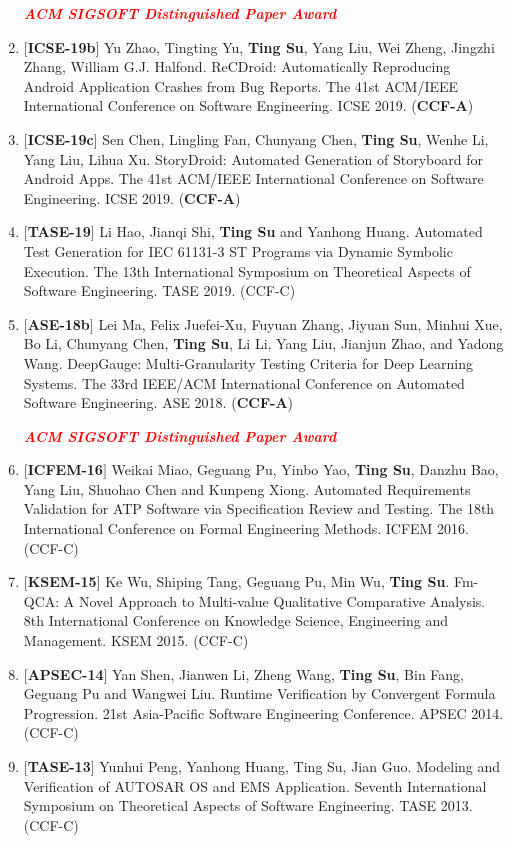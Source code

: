 \documentclass[margin]{res}
\begin{document}
\begin{resume}
\begin{enumerate}[leftmargin=*]
    \textbf{\emph{\textcolor{red}{ACM SIGSOFT Distinguished Paper Award}}}
    \item $[$\textbf{ICSE-19b}$]$ Yu Zhao, Tingting Yu, \textbf{Ting Su}, Yang Liu, Wei Zheng, Jingzhi Zhang, William G.J. Halfond. ReCDroid: Automatically Reproducing Android Application Crashes from Bug Reports. The 41st ACM/IEEE International Conference on Software Engineering. ICSE 2019. (\textbf{CCF-A})
    \item $[$\textbf{ICSE-19c}$]$ Sen Chen, Lingling Fan, Chunyang Chen, \textbf{Ting Su}, Wenhe Li, Yang Liu, Lihua Xu. StoryDroid: Automated Generation of Storyboard for Android Apps. The 41st ACM/IEEE International Conference on Software Engineering. ICSE 2019. (\textbf{CCF-A})
    \item $[$\textbf{TASE-19}$]$ Li Hao, Jianqi Shi, \textbf{Ting Su} and Yanhong Huang. Automated Test Generation for IEC 61131-3 ST Programs via Dynamic Symbolic Execution. The 13th International Symposium on Theoretical Aspects of Software Engineering. TASE 2019. (CCF-C)
    \item $[$\textbf{ASE-18b}$]$ Lei Ma, Felix Juefei-Xu, Fuyuan Zhang, Jiyuan Sun, Minhui Xue, Bo Li, Chunyang Chen, \textbf{Ting Su}, Li Li, Yang Liu, Jianjun Zhao, and Yadong Wang. DeepGauge: Multi-Granularity Testing Criteria for Deep Learning Systems. The 33rd IEEE/ACM International Conference on Automated Software Engineering. ASE 2018. (\textbf{CCF-A}) 
    
    \textbf{\emph{\textcolor{red}{ACM SIGSOFT Distinguished Paper Award}}}
    \item $[$\textbf{ICFEM-16}$]$ Weikai Miao, Geguang Pu, Yinbo Yao, \textbf{Ting Su}, Danzhu Bao, Yang Liu, Shuohao Chen and Kunpeng Xiong. Automated Requirements Validation for ATP Software via Specification Review and Testing. The 18th International Conference on Formal Engineering Methods. ICFEM 2016. (CCF-C)
    \item $[$\textbf{KSEM-15}$]$ Ke Wu, Shiping Tang, Geguang Pu, Min Wu, \textbf{Ting Su}. Fm-QCA: A Novel Approach to Multi-value Qualitative Comparative Analysis. 8th International Conference on Knowledge Science, Engineering and Management. KSEM 2015. (CCF-C)
    \item $[$\textbf{APSEC-14}$]$ Yan Shen, Jianwen Li, Zheng Wang, \textbf{Ting Su}, Bin Fang, Geguang Pu and Wangwei Liu. Runtime Verification by Convergent Formula Progression. 21st Asia-Pacific Software Engineering Conference. APSEC 2014. (CCF-C)
    \item $[$\textbf{TASE-13}$]$ Yunhui Peng, Yanhong Huang, Ting Su, Jian Guo. Modeling and Verification of AUTOSAR OS and EMS Application. Seventh International Symposium on Theoretical Aspects of Software Engineering. TASE 2013. (CCF-C)
\end{enumerate}


\end{resume}
\end{document}
